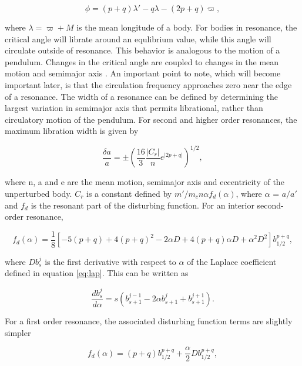\documentclass[onecolumn]{aastex63}
\begin{document}
\begin{equation}\label{eq:phi_crit}
	\phi = (p + q) \lambda' - q \lambda - (2 p + q) \varpi,
\end{equation}

\noindent where $\lambda = \varpi + M$ is the mean longitude of a body. For bodies in resonance, the critical angle will librate around an 
equlibrium value, while this angle will circulate outside of resonance. This behavior is analogous to the motion of a pendulum. Changes in the 
critical angle are coupled to changes in the mean motion and semimajor axis \citet{2000ssd..book.....M}. An important point to note, which will 
become important later, is that the circulation frequency approaches zero near the edge of a resonance. The width of a resonance can be 
defined by determining the largest variation in semimajor axis that permits librational, rather than circulatory motion of the pendulum. For 
second and higher order resonances, the maximum libration width is given by

\begin{equation}\label{eq:res_so}
	\frac{\delta a}{a} = \pm \left( \frac{16}{3} \frac{\left| C_{r} \right|}{n} e^{\left| 2 p + q \right|} \right)^{1/2},
\end{equation}

\noindent where n, a and e are the mean motion, semimajor axis and eccentricity of the unperturbed body. $C_{r}$ is a constant defined by $m'/m_{c} n \alpha f_{d}(\alpha)$, where $\alpha$ = $a/a'$ and $f_{d}$ is the resonant part of the disturbing function. For an interior second-order resonance,

\begin{equation}\label{eq:fd_so}
	f_{d} (\alpha) = \frac{1}{8} \left[ -5(p+q) + 4(p+q)^{2} - 2 \alpha D + 4(p+q) \alpha D + \alpha^{2} D^{2} \right] b^{p+q}_{1/2},
\end{equation}

\noindent where $D b^{j}_{s}$ is the first derivative with respect to $\alpha$ of the Laplace coefficient defined in equation \ref{eq:lap}. This can 
be written as

\begin{equation}\label{eq:lap_d}
	\frac{d b_{s}^{j}}{d \alpha} = s \left( b_{s+1}^{j-1} - 2 \alpha b_{s+1}^{j} + b_{s+1}^{j+1} \right).
\end{equation}

For a first order resonance, the associated disturbing function terms are slightly simpler

\begin{equation}\label{eq:fd_fo}
	f_{d}(\alpha) = (p+q) b_{1/2}^{p+q} + \frac{\alpha}{2} D b_{1/2}^{p+q},
\end{equation}
\end{document}

